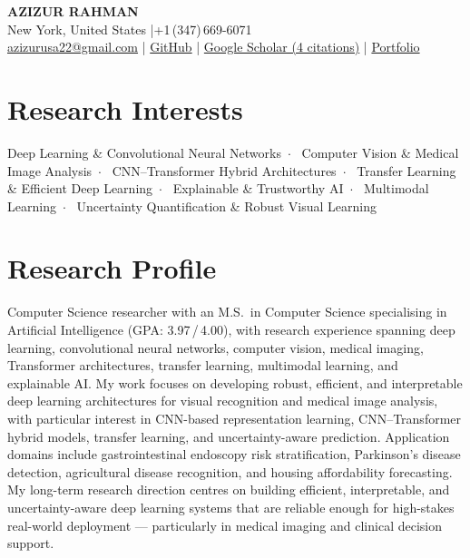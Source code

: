 \documentclass[11pt, letterpaper]{article}
\begin{document}
\pagestyle{fancy}
\fancyhf{}
\renewcommand{\headrulewidth}{0pt}
\fancyfoot[C]{\small\color{navy}\thepage}

\begin{center}
  {\LARGE\bfseries\color{navy} AZIZUR RAHMAN}\\[6pt]
  New York, United States \quad|\quad +1\,(347)\,669-6071\\[3pt]
  \href{mailto:azizurusa22@gmail.com}{azizurusa22@gmail.com}
  \;|\;
  \href{https://github.com/ayanchyaziz123}{GitHub}
  \;|\;
  \href{https://scholar.google.com/citations?hl=en&user=ZybW6NMAAAAJ}{Google Scholar (4 citations)}
  \;|\;
  \href{http://azizurrahman.netlify.app/}{Portfolio}
\end{center}

\vspace{4pt}

\section{Research Interests}

Deep Learning \& Convolutional Neural Networks~$\cdot$~
Computer Vision \& Medical Image Analysis~$\cdot$~
CNN–Transformer Hybrid Architectures~$\cdot$~
Transfer Learning \& Efficient Deep Learning~$\cdot$~
Explainable \& Trustworthy AI~$\cdot$~
Multimodal Learning~$\cdot$~
Uncertainty Quantification \& Robust Visual Learning

\section{Research Profile}

Computer Science researcher with an M.S.\ in Computer Science specialising in
Artificial Intelligence (GPA: 3.97\,/\,4.00), with research experience spanning
deep learning, convolutional neural networks, computer vision, medical imaging,
Transformer architectures, transfer learning, multimodal learning, and explainable
AI\@. My work focuses on developing robust, efficient, and interpretable deep
learning architectures for visual recognition and medical image analysis, with
particular interest in CNN-based representation learning, CNN–Transformer hybrid
models, transfer learning, and uncertainty-aware prediction. Application domains
include gastrointestinal endoscopy risk stratification, Parkinson's disease
detection, agricultural disease recognition, and housing affordability forecasting.
My long-term research direction centres on building efficient, interpretable, and
uncertainty-aware deep learning systems that are reliable enough for high-stakes
real-world deployment — particularly in medical imaging and clinical decision support.
\end{document}
